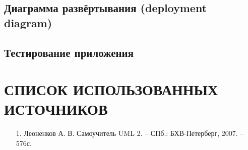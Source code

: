 \documentclass[12pt, a4paper, simple]{eskdtext}
\begin{document}
    \subsection{Диаграмма развёртывания (deployment diagram)}
    \subsection{Тестирование приложения}
    \newpage

    \newpage
    \section*{СПИСОК ИСПОЛЬЗОВАННЫХ ИСТОЧНИКОВ}
    \begin{enumerate}
        \item[1.] Леоненков А. В.
        Самоучитель UML 2. -- СПб.: БХВ-Петерберг, 2007. -- 576с.
    \end{enumerate}
    \newpage
\end{document}
